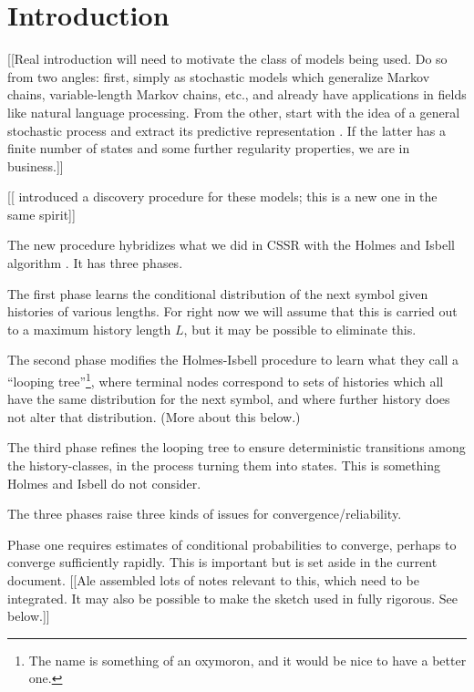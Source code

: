 \documentclass[../new-procedure.tex]{subfiles}
\begin{document}
\section{Introduction}

[[Real introduction will need to motivate the class of models being used.  Do
so from two angles: first, simply as stochastic models which generalize Markov
chains, variable-length Markov chains, etc., and already have applications in
fields like natural language processing.  From the other, start with the idea
of a general stochastic process and extract its predictive representation
\cite{Knight-predictive-view,Knight-foundations-of-prediction,CMPPSS,predictive-representations-of-state}.
If the latter has a finite number of states and some further regularity
properties, we are in business.]]

[[\cite{CSSR-for-UAI} introduced a discovery procedure for these models;
this is a new one in the same spirit]]

The new procedure hybridizes what we did in CSSR \cite{CSSR-for-UAI} with the
Holmes and Isbell algorithm \cite{Holmes-Isbell-looping}.  It has three phases.

The first phase learns the conditional distribution of the next symbol given
histories of various lengths.  For right now we will assume that this is
carried out to a maximum history length $L$, but it may be possible to
eliminate this.

The second phase modifies the Holmes-Isbell procedure to learn what they call a
``looping tree''\footnote{The name is something of an oxymoron, and it would be
  nice to have a better one.}, where terminal nodes correspond to sets of
histories which all have the same distribution for the next symbol, and where
further history does not alter that distribution.  (More about this below.)

The third phase refines the looping tree to ensure deterministic transitions
among the history-classes, in the process turning them into states.  This is
something Holmes and Isbell do not consider.

The three phases raise three kinds of issues for convergence/reliability.

Phase one requires estimates of conditional probabilities to converge, perhaps
to converge sufficiently rapidly.  This is important but is set aside in the
current document.  [[Ale assembled lots of notes relevant to this, which need
to be integrated.  It may also be possible to make the sketch used in
\cite{CSSR-for-UAI} fully rigorous.  See below.]]
\end{document}
